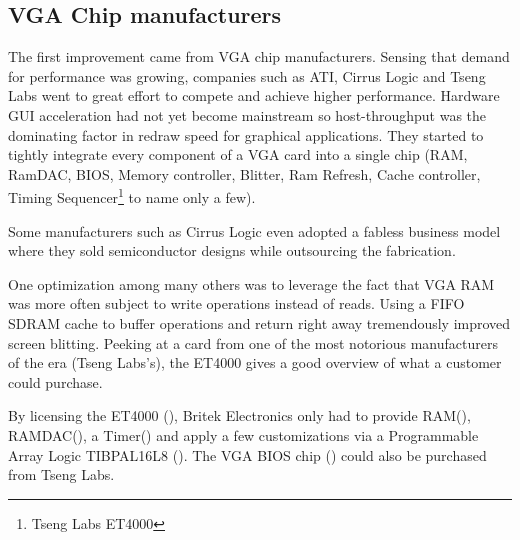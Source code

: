 \subsection{VGA Chip manufacturers}
The first improvement came from VGA chip manufacturers. Sensing that demand for performance was growing, companies such as ATI, Cirrus Logic and Tseng Labs went to great effort to compete and achieve higher performance. Hardware GUI acceleration had not yet become mainstream so host-throughput was the dominating factor in redraw speed for graphical applications. They started to tightly integrate every component of a VGA card into a single chip (RAM, RamDAC, BIOS, Memory controller, Blitter, Ram Refresh, Cache controller, Timing Sequencer\footnote{Tseng Labs ET4000} to name only a few).\\
\par
Some manufacturers such as Cirrus Logic even adopted a fabless business model where they sold semiconductor designs while outsourcing the fabrication.


One optimization among many others was to leverage the fact that VGA RAM was more often subject to write operations instead of reads. Using a FIFO SDRAM cache to buffer operations and return right away tremendously improved screen blitting. Peeking at a card from one of the most notorious manufacturers of the era (Tseng Labs's), the ET4000 gives a good overview of what a customer could purchase.\\ 
\par
{}
\par
By licensing the ET4000 (), Britek Electronics only had to provide RAM(), RAMDAC(), a Timer() and apply a few customizations via a Programmable Array Logic TIBPAL16L8 (). The VGA BIOS chip () could also be purchased from Tseng Labs.\\
\par
\vspace{10pt}

\par



